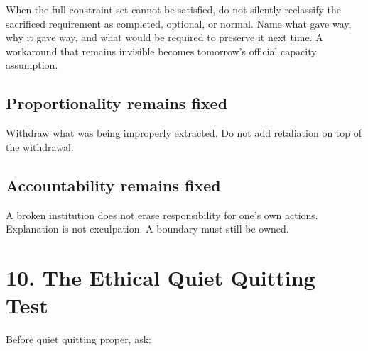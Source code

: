 \documentclass[11pt,oneside]{article}
\begin{document}
When the full constraint set cannot be satisfied, do not silently
reclassify the sacrificed requirement as completed, optional, or normal.
Name what gave way, why it gave way, and what would be required to
preserve it next time. A workaround that remains invisible becomes
tomorrow's official capacity assumption.

\subsection{Proportionality remains
fixed}\label{proportionality-remains-fixed}

Withdraw what was being improperly extracted. Do not add retaliation on
top of the withdrawal.

\subsection{Accountability remains
fixed}\label{accountability-remains-fixed}

A broken institution does not erase responsibility for one's own
actions. Explanation is not exculpation. A boundary must still be owned.

\section{10. The Ethical Quiet Quitting
Test}\label{the-ethical-quiet-quitting-test}

Before quiet quitting proper, ask:
\end{document}
